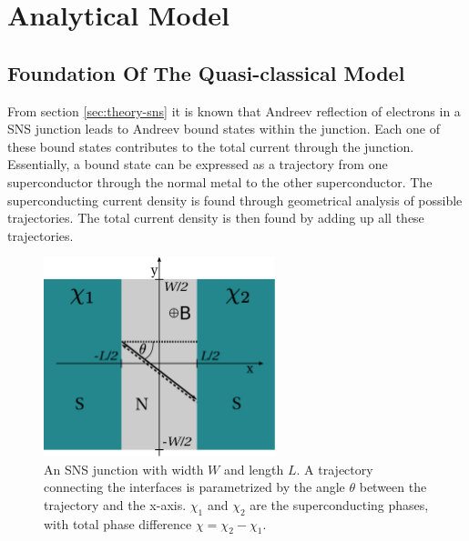 \chapter{Analytical Model}
\label{ch:analyticalmodel}

\section{Foundation Of The Quasi-classical Model}
From section \ref{sec:theory-sns} it is known that Andreev reflection of electrons in a SNS junction leads to Andreev bound states within the junction. Each one of these bound states contributes to the total current through the junction. Essentially, a bound state can be expressed as a trajectory from one superconductor through the normal metal to the other superconductor. The superconducting current density is found through geometrical analysis of possible trajectories. The total current density is then found by adding up all these trajectories.
\begin{figure}[h]
\centering	
\includegraphics[width=0.6\textwidth]{figure/analyticalmodel/sns_junction_csch}
\caption{An SNS junction with width $W$ and length $L$. A trajectory connecting the interfaces is parametrized by the angle $\theta$ between the trajectory and the x-axis. $\chi_1$ and $\chi_2$ are the superconducting phases, with total phase difference $\chi = \chi_2 - \chi_1$.}
\label{fig:sns_schematic}
\end{figure}

